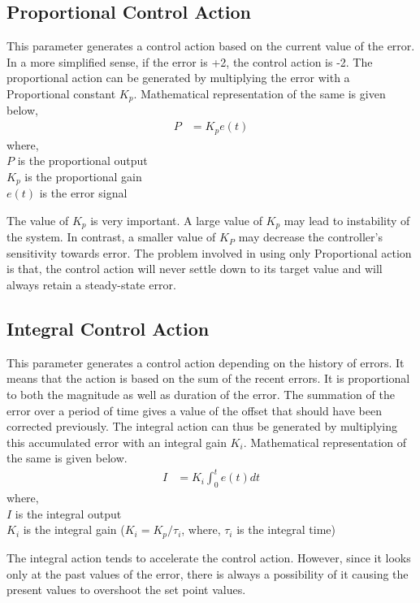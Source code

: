  \subsection{Proportional Control Action}
This parameter generates a control action based on the current value of the error. In a more simplified sense, if the error is +2, the control action is  -2. The proportional action can be generated by multiplying the error with a Proportional constant $K_p$. Mathematical representation of the same is given below,
\begin{align}
P &= K_p e(t)
\end{align}
where,\\
$P$ is the proportional output\\
$K_p$ is the proportional gain\\
$e(t)$ is the error signal

The value of  $K_p$ is very important. A large value of $K_p$ may lead to instability of the system. In contrast, a smaller value of $K_P$ may decrease the controller's sensitivity towards error. The problem involved in using only Proportional action is that, the control action will never settle down to its target value and will always retain a steady-state error.
\subsection{Integral Control Action}
This parameter generates a control action depending on the history of errors. It means that the action is based on the sum of the recent errors. It is proportional to both the magnitude as well as duration of the error. The summation of the error over a period of time gives a value of the offset that should have been corrected previously. The integral action can thus be generated by multiplying this accumulated error with an integral gain $K_i$. Mathematical representation of the same is given below.
\begin{align}
I&=K_i\int_0^te(t)dt
\end{align}
where,\\
$I$ is the integral output\\
$K_i$ is the integral gain ($K_i=K_p / \tau _i$, where, $\tau _i$ is the integral time)

The integral action tends to accelerate the control action. However, since it looks only at the past values of the error, there is always a possibility of it causing the present values to overshoot the set point values.
